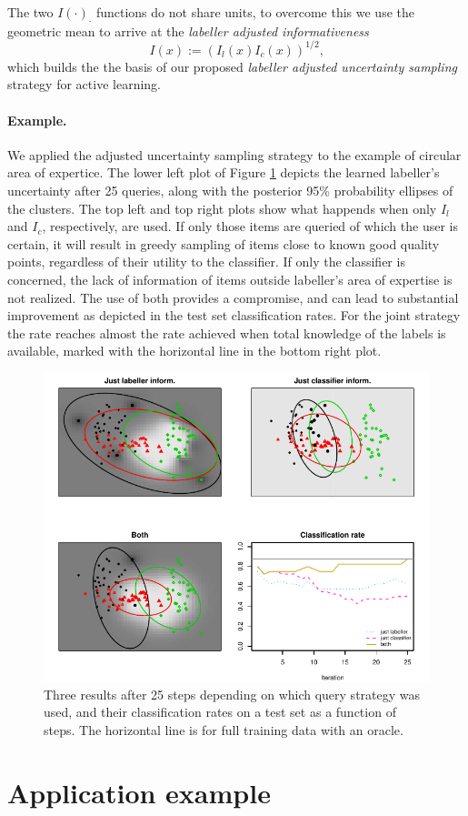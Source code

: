 \documentclass[10pt, onecolumn]{article}
\begin{document}
The two $I(\cdot)_{\cdot}$ functions do not share units, to overcome
this we use the geometric mean to arrive at the \emph{labeller
  adjusted informativeness}
\[
I(x):=(I_l(x) I_c(x))^{1/2}\mbox{,}
\]
which builds the the basis of our proposed \emph{labeller adjusted
  uncertainty sampling} strategy for active learning.   


\paragraph{Example.} We applied the adjusted uncertainty sampling
strategy to the example of circular area of expertice. The lower left
plot of Figure \ref{fig:four_square} depicts the learned labeller's
uncertainty after 25 queries, along with the posterior 95\%
probability ellipses of the clusters. The top left and top right plots
show what happends when only $I_l$ and $I_c$, respectively, are
used. If only those items are queried of which the user is certain, it
will result in greedy sampling of items close to known good quality
points, regardless of their utility to the classifier. If only the
classifier is concerned, the lack of information of items outside
labeller's area of expertise is not realized. The use of both provides
a compromise, and can lead to substantial improvement as depicted in
the test set classification rates. For the joint strategy the rate
reaches almost the rate achieved when total knowledge of the labels is
available, marked with the horizontal line in the bottom right plot.

\begin{figure}[hbtp]
\centering
\includegraphics[width=6in]{figures/3_fields_and_tsplot.pdf}
\caption{Three results after 25 steps depending on which query
  strategy was used, and their classification rates on a test set as a
  function of steps. The horizontal line is for full training data
  with an oracle.}
\label{fig:four_square}
\end{figure}



\section{Application example}



\appendix


\end{document}
